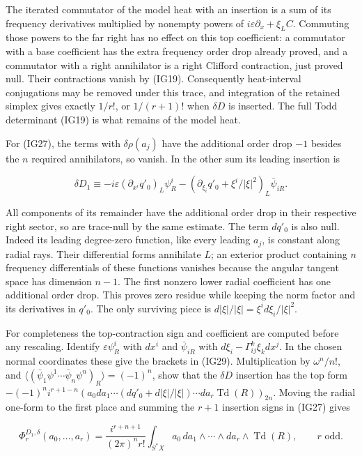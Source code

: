\documentclass[
  11pt,
]{article}
\newcounter{none} %
\begin{document}
The iterated commutator of the model heat with an insertion is a sum of
its frequency derivatives multiplied by nonempty powers of
\(i\varepsilon\partial_x+\xi_L C\). Commuting those powers to the far
right has no effect on this top coefficient: a commutator with a base
coefficient has the extra frequency order drop already proved, and a
commutator with a right annihilator is a right Clifford contraction,
just proved null. Their contractions vanish by (IG19). Consequently
heat-interval conjugations may be removed under this trace, and
integration of the retained simplex gives exactly \(1/r!\), or
\(1/(r+1)!\) when \(\delta D\) is inserted. The full Todd determinant
(IG19) is what remains of the model heat.

For (IG27), the terms with \(\delta\rho(a_j)\) have the additional order
drop \(-1\) besides the \(n\) required annihilators, so vanish. In the
other sum its leading insertion is

\[
 \delta D_1\equiv
 -i\varepsilon(\partial_{x^i}q'_0)_L\psi_R^i
 -(\partial_{\xi_i}q'_0+\xi^i/|\xi|^2)_L\bar\psi_{iR}.
\tag{IG30}
\]

All components of its remainder have the additional order drop in their
respective right sector, so are trace-null by the same estimate. The
term \(dq'_0\) is also null. Indeed its leading degree-zero function,
like every leading \(a_j\), is constant along radial rays. Their
differential forms annihilate \(L\); an exterior product containing
\(n\) frequency differentials of these functions vanishes because the
angular tangent space has dimension \(n-1\). The first nonzero lower
radial coefficient has one additional order drop. This proves zero
residue while keeping the norm factor and its derivatives in \(q'_0\).
The only surviving piece is \(d|\xi|/|\xi|=\xi^id\xi_i/|\xi|^2\).

For completeness the top-contraction sign and coefficient are computed
before any rescaling. Identify \(\varepsilon\psi_R^i\) with \(dx^i\) and
\(\bar\psi_{iR}\) with \(d\xi_i-\Gamma^k_{ij}\xi_kdx^j\). In the chosen
normal coordinates these give the brackets in (IG29). Multiplication by
\(\omega^n/n!\), and
\(\langle(\bar\psi_1\psi^1\cdots\bar\psi_n\psi^n)_R\rangle=(-1)^n\),
show that the \(\delta D\) insertion has the top form
\(-(-1)^ni^{r+1-n}(a_0da_1\cdots(dq'_0+d|\xi|/|\xi|)\cdots da_r\operatorname{Td}(R))_{2n}\).
Moving the radial one-form to the first place and summing the \(r+1\)
insertion signs in (IG27) gives

\[
 \Phi_r^{D_1,\delta}(a_0,\ldots,a_r)=
 \frac{i^{r+n+1}}{(2\pi)^n r!}
       \int_{S^*X}a_0\,da_1\wedge\cdots\wedge da_r
                          \wedge\operatorname{Td}(R),
                  \qquad r\text{ odd}.
\tag{IG31}
\]
\end{document}
